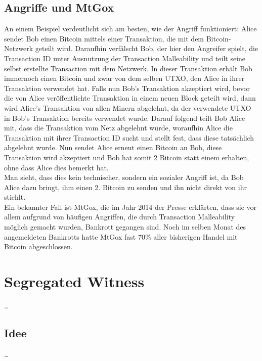 \subsection{Angriffe und MtGox}
\label{sec:FirstContentSection:Angriffe}
An einem Beispiel verdeutlicht sich am besten, wie der Angriff funktioniert:
Alice sendet Bob einen Bitcoin mittels einer Transaktion, die mit dem Bitcoin-Netzwerk geteilt wird.
Daraufhin verfälscht Bob, der hier den Angreifer spielt, die Transaction ID unter Ausnutzung der Transaction Malleability und teilt seine selbst erstellte Transaction mit dem Netzwerk. In dieser Transaktion erhält Bob immernoch einen Bitcoin und zwar von dem selben UTXO, den Alice in ihrer Transaktion verwendet hat.
Falls nun Bob's Transaktion akzeptiert wird, bevor die von Alice veröffentlichte Transaktion in einem neuen Block geteilt wird, dann wird Alice's Transaktion von allen Minern abgelehnt, da der verwendete UTXO in Bob's Transaktion bereits verwendet wurde.
Darauf folgend teilt Bob Alice mit, dass die Transaktion vom Netz abgelehnt wurde, woraufhin Alice die Transaktion mit ihrer Transaction ID sucht und stellt fest, dass diese tatsächlich abgelehnt wurde. Nun sendet Alice erneut einen Bitcoin an Bob, diese Transaktion wird akzeptiert und Bob hat somit 2 Bitcoin statt einem erhalten, ohne dass Alice dies bemerkt hat. \\
Man sieht, dass dies kein technischer, sondern ein sozialer Angriff ist, da Bob Alice dazu bringt, ihm einen 2. Bitcoin zu senden und ihn nicht direkt von ihr stiehlt. \\
Ein bekannter Fall ist MtGox, die im Jahr 2014 der Presse erklärten, dass sie vor allem aufgrund von häufigen Angriffen, die durch Transaction Malleability möglich gemacht wurden, Bankrott gegangen sind. \cite{springer:malleability_and_mtgox}
Noch im selben Monat des angemeldeten Bankrotts hatte MtGox fast 70\% aller bisherigen Handel mit Bitcoin abgeschlossen. \cite{springer:malleability_and_mtgox}


\section{Segregated Witness}
\label{ch:SegWit}

\dots

\subsection{Idee}
\label{sec:SegWit:Idee}

\dots


